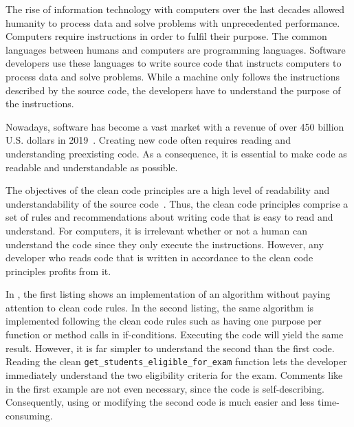 The rise of information technology with computers over the last decades allowed humanity to process data and solve problems with unprecedented performance. Computers require instructions in order to fulfil their purpose. The common languages between humans and computers are programming languages. Software developers use these languages to write source code that instructs computers to process data and solve problems. While a machine only follows the instructions described by the source code, the developers have to understand the purpose of the instructions. 

Nowadays, software has become a vast market with a revenue of over 450 billion U.S. dollars in 2019~\cite{statista_software_nodate,costello_gartner_2019}. Creating new code often requires reading and understanding preexisting code. As a consequence, it is essential to make code as readable and understandable as possible. 

The objectives of the clean code principles are a high level of readability and understandability of the source code~\cite{martin_clean_2009}. Thus, the clean code principles comprise a set of rules and recommendations about writing code that is easy to read and understand. For computers, it is irrelevant whether or not a human can understand the code since they only execute the instructions. However, any developer who reads code that is written in accordance to the clean code principles profits from it. 

In , the first listing shows an implementation of an algorithm without paying attention to clean code rules. In the second listing, the same algorithm is implemented following the clean code rules such as having one purpose per function or method calls in if-conditions. Executing the code will yield the same result. However, it is far simpler to understand the second than the first code. Reading the clean \texttt{get\_students\_eligible\_for\_exam} function lets the developer immediately understand the two eligibility criteria for the exam. Comments like in the first example are not even necessary, since the code is self-describing.
Consequently, using or modifying the second code is much easier and less time-consuming.

